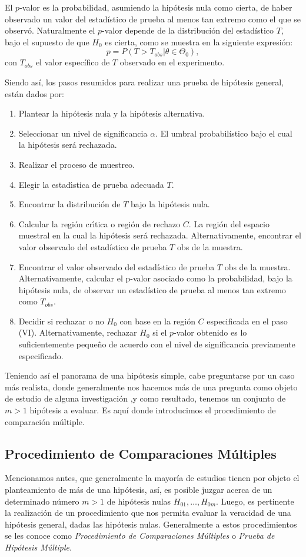 \documentclass[11pt,letterpaper]{article}
\begin{document}
El $p$-valor es la probabilidad, asumiendo la hipótesis nula como cierta, de haber observado un valor
del estadístico de prueba al menos tan extremo como el que se observó. Naturalmente el $p$-valor
depende de la distribución del estadístico $T$, bajo el supuesto de que $H_0$ es cierta, como se muestra en la siguiente expresión:
\begin{equation*}
	p=P(T>T_{obs}|\theta\in\Theta_0),
\end{equation*}
con $T_{obs}$ el valor específico de $T$ observado en el experimento.

Siendo así, los pasos resumidos para realizar una prueba de hipótesis general, están dados por:
\begin{enumerate}[I]
	\item Plantear la hipótesis nula y la hipótesis alternativa.
	\item Seleccionar un nivel de significancia $\alpha$. El umbral probabilístico bajo el cual la hipótesis será rechazada.
	\item Realizar el proceso de muestreo.
	\item Elegir la estadı́stica de prueba adecuada $T$.
	\item Encontrar la distribución de $T$ bajo la hipótesis nula.
	\item Calcular la región crı́tica o región de rechazo $C$. La región del espacio muestral en la cual la
	hipótesis será rechazada. Alternativamente, encontrar el valor observado del estadístico de prueba $T$ obs de la muestra.
	\item Encontrar el valor observado del estadístico de prueba $T$ obs de la muestra. Alternativamente, calcular el p-valor asociado como la probabilidad, bajo la hipótesis nula, de observar un estadístico
	de prueba al menos tan extremo como $T_{obs}$.
	\item Decidir si rechazar o no $H_0$ con base en la región $C$ especificada en el paso (VI). Alternativamente, rechazar $H_0$ si el $p$-valor obtenido es lo suficientemente pequeño de acuerdo con el nivel de significancia previamente especificado.
\end{enumerate}
Teniendo así el panorama de una hipótesis simple, cabe preguntarse por un caso más realista, donde generalmente nos hacemos más de una pregunta como objeto de estudio de alguna investigación ,y como resultado, tenemos un conjunto de $m>1$ hipótesis a evaluar. Es aquí donde introducimos el procedimiento de comparación múltiple.

\subsection{Procedimiento de Comparaciones Múltiples}
Mencionamos antes, que generalmente la mayoría de estudios tienen por objeto el planteamiento de más de una hipótesis, así, es posible juzgar acerca de un determinado número $m>1$ de hipótesis nulas $H_{01},\dots,H_{0m}$. Luego, es pertinente la realización de un procedimiento que nos permita evaluar la veracidad de una hipótesis general, dadas las hipótesis nulas. Generalmente a estos procedimientos se les conoce como \textit{Procedimiento de Comparaciones Múltiples} o \textit{Prueba de Hipótesis Múltiple}.
\end{document}
